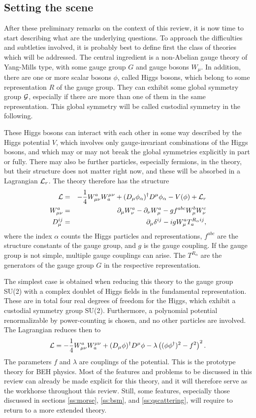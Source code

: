 \documentclass[final,twoside,12pt]{article}
\newcommand*{\La}{{\cal{L}}}
\newcommand*{\no}{\noindent}
\newcommand*{\bea}{\begin{eqnarray}}
\newcommand*{\eea}{\end{eqnarray}}
\newcommand*{\be}{\begin{equation}}
\newcommand*{\ee}{\end{equation}}
\newcommand*{\pd}{\partial}
\newcommand*{\pdm}{\pd_{\mu}}
\newcommand*{\pdn}{\pd_{\nu}}
\newcommand*{\mn}{{\mu\nu}}
\newcommand*{\nn}{\nonumber}
\newcommand*{\1}{1\!\!\!\bot}
\begin{document}
\subsection{Setting the scene}

After these preliminary remarks on the context of this review, it is now time to start describing what are the underlying questions. To approach the difficulties and subtleties involved, it is probably best to define first the class of theories which will be addressed. The central ingredient is a non-Abelian gauge theory of Yang-Mills type, with some gauge group $G$ and gauge bosons $W_\mu$. In addition, there are one or more scalar bosons $\phi$, called Higgs bosons, which belong to some representation $R$ of the gauge group. They can exhibit some global symmetry group ${\cal G}$, especially if there are more than one of them in the same representation. This global symmetry will be called custodial symmetry in the following.

These Higgs bosons can interact with each other in some way described by the Higgs potential $V$, which involves only gauge-invariant combinations of the Higgs bosons, and which may or may not break the global symmetries explicitly in part or fully. There may also be further particles, especially fermions, in the theory, but their structure does not matter right now, and these will be absorbed in a Lagrangian ${\La}_r$. The theory therefore has the structure
\bea
{\La}&=&-\frac{1}{4}W_\mn^aW^\mn_a+(D_\mu\phi_\alpha)^\dagger D^\mu\phi_\alpha-V(\phi)+{\La}_r\label{la:gen}\\
W_\mn^a&=&\pdm W_\nu^a-\pdn W_\mu^a-g f^{abc} W_\mu^b W_\nu^c\nn\\
D_\mu^{ij}&=&\pd_\mu\delta^{ij}-igW_\mu^aT^{R_\alpha ij}_a\label{covderiv},
\eea
\no where the index $\alpha$ counts the Higgs particles and representations, $f^{abc}$ are the structure constants of the gauge group, and $g$ is the gauge coupling. If the gauge group is not simple, multiple gauge couplings can arise. The $T^{R_\alpha}$ are the generators of the gauge group $G$ in the respective representation.

The simplest case is obtained when reducing this theory to the gauge group SU(2) with a complex doublet of Higgs fields in the fundamental representation. These are in total four real degrees of freedom for the Higgs, which exhibit a custodial symmetry group SU(2). Furthermore, a polynomial potential renormalizable by power-counting is chosen, and no other particles are involved. The Lagrangian reduces then to
\be
\La=-\frac{1}{4}W_\mn^aW^\mn_a+(D_\mu\phi)^\dagger D^\mu\phi-\lambda\left((\phi\phi^\dagger)^2-f^2\right)^2\label{la:beh}.
\ee
\no The parameters $f$ and $\lambda$ are couplings of the potential. This is the prototype theory for BEH physics. Most of the features and problems to be discussed in this review can already be made explicit for this theory, and it will therefore serve as the workhorse throughout this review. Still, some features, especially those discussed in sections \ref{ss:morse}, \ref{ss:bsm}, and \ref{ss:qscattering}, will require to return to a more extended theory.
\end{document}
